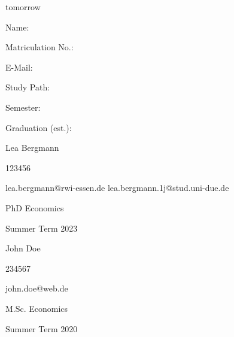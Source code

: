 \documentclass[11pt,a4paper]{article}
\begin{document}
\begin{titlepage}
  \noindent\begin{minipage}[t]{0.3\textwidth}
  \end{minipage}
  \begin{minipage}[t]{0.7\textwidth}
  \hspace{1cm}
  \end{minipage}

  \noindent\begin{minipage}[t]{0.3\textwidth}
  \end{minipage}
  \begin{minipage}[t]{0.7\textwidth}
  \hspace{1cm}tomorrow
  \end{minipage}

  \hrulefill

  \begin{multicols}{3}

  Name:

  Matriculation No.:

  E-Mail:

  Study Path:

  Semester:

  Graduation (est.):

  \columnbreak

 Lea Bergmann

  123456

lea.bergmann@rwi-essen.de
lea.bergmann.1j@stud.uni-due.de

PhD Economics


  Summer Term 2023

  \columnbreak

  John Doe

  234567

  john.doe@web.de

  M.Sc. Economics


  Summer Term 2020


  \end{multicols}

\end{titlepage}



{
\hypersetup{linkcolor=black}

\setcounter{tocdepth}{3}
\tableofcontents
}
\end{document}

